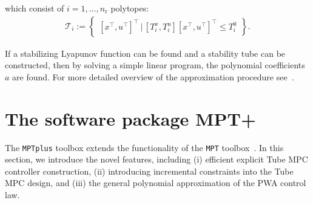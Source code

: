 \documentclass[letterpaper, 10 pt, conference]{ieeeconf}
\begin{document}
which consist of $i = 1, \dots, n_\mathrm{r}$ polytopes:
\begin{eqnarray}
	\label{eq:stab_tube_polytope}
	\mathcal{T}_i := \begin{Bmatrix}
		[x^\top, u^\top]^\top \,|\, [T_i^x, T_i^u] [x^\top, u^\top]^\top \le T_i^0		
	\end{Bmatrix}. 
\end{eqnarray}

If a stabilizing Lyapunov function can be found and a stability tube can be constructed, then by solving a simple linear program, the polynomial coefficients $a$ are found. For more detailed overview of the approximation procedure see~\cite{kvasnica_polynomial}.

%


\section{The software package MPT+}
\label{sec:code}



The \texttt{MPTplus} toolbox extends the functionality of the \texttt{MPT} toolbox~\cite{MPT3}. In this section, we introduce the novel features, including (i) efficient explicit Tube MPC controller construction, (ii) introducing incremental constraints into the Tube MPC design, and (iii) the general polynomial approximation of the PWA control law. 
\end{document}

